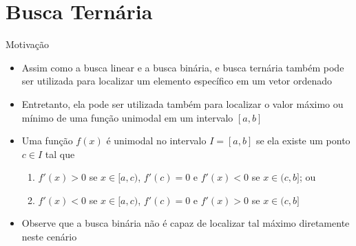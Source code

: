 \section{Busca Ternária}

\begin{frame}[fragile]{Motivação}

    \begin{itemize}
        \item Assim como a busca linear e a busca binária, e busca ternária também
            pode ser utilizada para localizar um elemento específico em um vetor ordenado

        \item Entretanto, ela pode ser utilizada também para localizar o valor máximo ou
            mínimo de uma função unimodal em um intervalo $[a, b]$

        \item Uma função $f(x)$ é unimodal no intervalo $I = [a, b]$ se ela existe um ponto 
            $c\in I$ tal que
            \begin{enumerate}
                \item $f'(x) > 0$ se $x \in[a, c)$, $f'(c) = 0$ e $f'(x) < 0$ se $x\in (c, b]$; ou
                \item $f'(x) < 0$ se $x \in[a, c)$, $f'(c) = 0$ e $f'(x) > 0$ se $x\in (c, b]$
            \end{enumerate}

        \item Observe que a busca binária não é capaz de localizar tal máximo diretamente
            neste cenário
    \end{itemize}

\end{frame}



